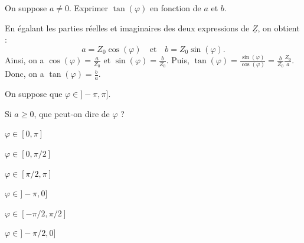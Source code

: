 




\begin{enonce}
	On suppose $a\neq 0$. Exprimer $\tan(\varphi)$ en fonction de $a$ et $b$.
\end{enonce}


\begin{corrige}
	En égalant les parties réelles et imaginaires des deux expressions de $\underline{Z}$, on  obtient :
	\[
	a=Z_0 \cos (\varphi) \quad \text{et} \quad b=Z_0 \sin (\varphi).
	\]
	Ainsi, on a 
	$\cos (\varphi) = \frac{a}{Z_0}$ et $\sin (\varphi) = \frac{b}{Z_0}$.
	Puis, $\tan (\varphi) = \frac{\sin(\varphi)}{\cos (\varphi)} = \frac{b}{Z_0} \frac{Z_0}{a}$. Donc, on a 
	$\tan (\varphi) = \frac{b}{a}$.
\end{corrige}


\pauseEntrainement

\hauteurLargeurCadreReponse		{6mm}{2cm}


\medskip
On suppose que $\varphi \in {]}-\pi, \pi{]}$. 

\repriseEntrainement


\begin{enonce}
Si $a\geq 0$, que peut-on dire de $\varphi$ ?
\begin{listeQCM3Colonnes}
	\item $\varphi \in [0, \pi]$
	\item $ \varphi \in [0, \pi/2]$
	\item $\varphi \in [\pi/2, \pi]$
	\item $\varphi \in {]}-\pi, 0]$
	\item $\varphi \in [-\pi/2, \pi/2]$
	\item $\varphi \in {]}-\pi/2, 0]$
\end{listeQCM3Colonnes}
\bigskip
\end{enonce}

